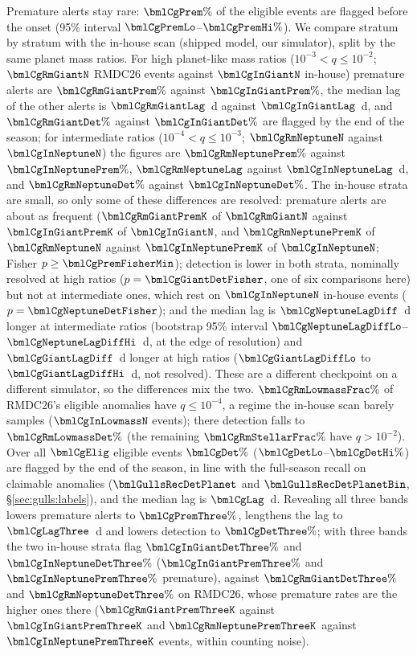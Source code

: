 Premature alerts stay rare: $\bmlCgPrem\%$ of the eligible events are flagged before the onset (95\%
interval $\bmlCgPremLo$--$\bmlCgPremHi\%$). We compare stratum by stratum with the in-house scan (shipped
model, our simulator), split by the same planet mass ratios. For high planet-like mass ratios ($10^{-3} < q \le 10^{-2}$;
$\bmlCgRmGiantN$ RMDC26 events against $\bmlCgInGiantN$ in-house) premature alerts are $\bmlCgRmGiantPrem\%$
against $\bmlCgInGiantPrem\%$, the median lag of the other alerts is $\bmlCgRmGiantLag$~d against
$\bmlCgInGiantLag$~d, and $\bmlCgRmGiantDet\%$ against $\bmlCgInGiantDet\%$ are flagged by the end of the
season; for intermediate ratios ($10^{-4} < q \le 10^{-3}$; $\bmlCgRmNeptuneN$ against $\bmlCgInNeptuneN$) the figures are
$\bmlCgRmNeptunePrem\%$ against $\bmlCgInNeptunePrem\%$, $\bmlCgRmNeptuneLag$ against $\bmlCgInNeptuneLag$~d,
and $\bmlCgRmNeptuneDet\%$ against $\bmlCgInNeptuneDet\%$. The in-house strata are small, so only some of these
differences are resolved: premature alerts are about as frequent ($\bmlCgRmGiantPremK$ of $\bmlCgRmGiantN$ against $\bmlCgInGiantPremK$ of
$\bmlCgInGiantN$, and $\bmlCgRmNeptunePremK$ of $\bmlCgRmNeptuneN$ against $\bmlCgInNeptunePremK$ of $\bmlCgInNeptuneN$; Fisher $p \ge \bmlCgPremFisherMin$); detection is lower in both strata,
nominally resolved at high ratios ($p = \bmlCgGiantDetFisher$, one of six comparisons here) but not at intermediate ones, which rest on
$\bmlCgInNeptuneN$ in-house events ($p = \bmlCgNeptuneDetFisher$); and the median lag is $\bmlCgNeptuneLagDiff$~d longer at intermediate ratios (bootstrap 95\% interval
$\bmlCgNeptuneLagDiffLo$--$\bmlCgNeptuneLagDiffHi$~d, at the edge of resolution) and $\bmlCgGiantLagDiff$~d longer at high ratios
($\bmlCgGiantLagDiffLo$ to $\bmlCgGiantLagDiffHi$~d, not resolved). These are a different checkpoint on a different simulator, so the differences mix the two. $\bmlCgRmLowmassFrac\%$ of RMDC26's eligible anomalies have $q \le 10^{-4}$, a regime the in-house
scan barely samples ($\bmlCgInLowmassN$ events); there detection falls to $\bmlCgRmLowmassDet\%$ (the remaining
$\bmlCgRmStellarFrac\%$ have $q > 10^{-2}$). Over all
$\bmlCgElig$ eligible events $\bmlCgDet\%$ ($\bmlCgDetLo$--$\bmlCgDetHi\%$) are flagged by the end of the season,
in line with the full-season recall on claimable anomalies ($\bmlGullsRecDetPlanet$ and
$\bmlGullsRecDetPlanetBin$, \S\ref{sec:gulls:labels}), and the median lag is $\bmlCgLag$~d. Revealing all three
bands lowers premature alerts to $\bmlCgPremThree\%$, lengthens the lag to $\bmlCgLagThree$~d and lowers detection
to $\bmlCgDetThree\%$; with three bands the two in-house strata flag $\bmlCgInGiantDetThree\%$ and
$\bmlCgInNeptuneDetThree\%$ ($\bmlCgInGiantPremThree\%$ and $\bmlCgInNeptunePremThree\%$ premature), against
$\bmlCgRmGiantDetThree\%$ and $\bmlCgRmNeptuneDetThree\%$ on RMDC26, whose premature rates are the higher ones there
($\bmlCgRmGiantPremThreeK$ against $\bmlCgInGiantPremThreeK$ and $\bmlCgRmNeptunePremThreeK$ against
$\bmlCgInNeptunePremThreeK$ events, within counting noise).

